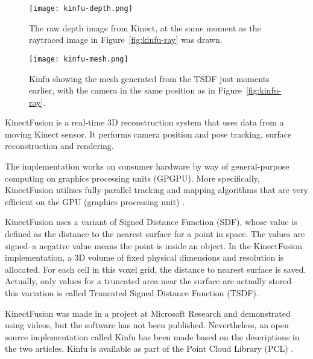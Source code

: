 \begin{figure}
    \centering
    \texttt{[image: kinfu-depth.png]}
    \caption{The raw depth image from Kinect, at the same moment as the raytraced image in Figure~\ref{fig:kinfu-ray} was drawn.}
    \label{fig:kinfu-depth}
\end{figure}

\begin{figure}
    \centering
    \texttt{[image: kinfu-mesh.png]}
    \caption{Kinfu showing the mesh generated from the TSDF just moments earlier, with the camera in the same position as in Figure~\ref{fig:kinfu-ray}.}
    \label{fig:kinfu-mesh}
\end{figure}

KinectFusion is a real-time 3D reconstruction system that uses data from a moving Kinect sensor. It performs camera position and pose tracking, surface reconstruction and rendering. \citep{izadi2011kinectfusion}

The implementation works on consumer hardware by way of general-purpose computing on graphics processing units (GPGPU). More specifically, KinectFusion utilizes fully parallel tracking and mapping algorithms that are very efficient on the GPU (graphics processing unit) \citep{newcombe2011kinectfusion}.

KinectFusion uses a variant of Signed Distance Function (SDF), whose value is defined as the distance to the nearest surface for a point in space. The values are signed--a negative value means the point is inside an object. In the KinectFusion implementation, a 3D volume of fixed physical dimensions and resolution is allocated. For each cell in this voxel grid, the distance to nearest surface is saved. Actually, only values for a truncated area near the surface are actually stored--this variation is called Truncated Signed Distance Function (TSDF). \citep{izadi2011kinectfusion}


\newtopic

KinectFusion was made in a project at Microsoft Research and demonstrated using videos, but the software has not been published. Nevertheless, an open source implementation called Kinfu has been made based on the descriptions in the two articles. Kinfu is available as part of the Point Cloud Library (PCL) \citep{PCL}.

